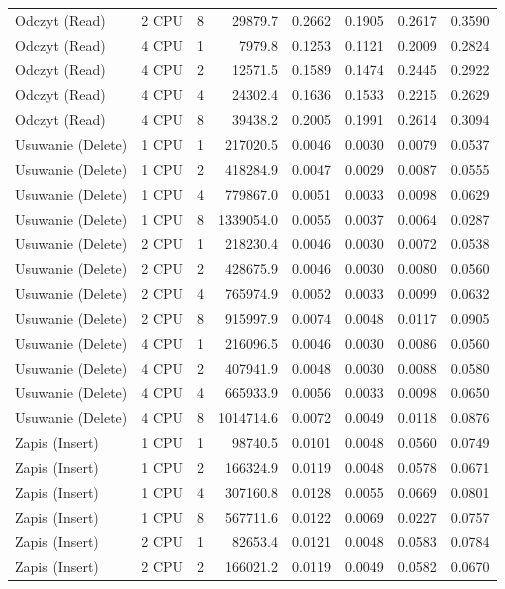\begin{table}[ht]
{\begin{tabular}{llcrrrrr}
Odczyt (Read) & 2 CPU & 8 & 29879.7 & 0.2662 & 0.1905 & 0.2617 & 0.3590 \\
Odczyt (Read) & 4 CPU & 1 & 7979.8 & 0.1253 & 0.1121 & 0.2009 & 0.2824 \\
Odczyt (Read) & 4 CPU & 2 & 12571.5 & 0.1589 & 0.1474 & 0.2445 & 0.2922 \\
Odczyt (Read) & 4 CPU & 4 & 24302.4 & 0.1636 & 0.1533 & 0.2215 & 0.2629 \\
Odczyt (Read) & 4 CPU & 8 & 39438.2 & 0.2005 & 0.1991 & 0.2614 & 0.3094 \\
Usuwanie (Delete) & 1 CPU & 1 & 217020.5 & 0.0046 & 0.0030 & 0.0079 & 0.0537 \\
Usuwanie (Delete) & 1 CPU & 2 & 418284.9 & 0.0047 & 0.0029 & 0.0087 & 0.0555 \\
Usuwanie (Delete) & 1 CPU & 4 & 779867.0 & 0.0051 & 0.0033 & 0.0098 & 0.0629 \\
Usuwanie (Delete) & 1 CPU & 8 & 1339054.0 & 0.0055 & 0.0037 & 0.0064 & 0.0287 \\
Usuwanie (Delete) & 2 CPU & 1 & 218230.4 & 0.0046 & 0.0030 & 0.0072 & 0.0538 \\
Usuwanie (Delete) & 2 CPU & 2 & 428675.9 & 0.0046 & 0.0030 & 0.0080 & 0.0560 \\
Usuwanie (Delete) & 2 CPU & 4 & 765974.9 & 0.0052 & 0.0033 & 0.0099 & 0.0632 \\
Usuwanie (Delete) & 2 CPU & 8 & 915997.9 & 0.0074 & 0.0048 & 0.0117 & 0.0905 \\
Usuwanie (Delete) & 4 CPU & 1 & 216096.5 & 0.0046 & 0.0030 & 0.0086 & 0.0560 \\
Usuwanie (Delete) & 4 CPU & 2 & 407941.9 & 0.0048 & 0.0030 & 0.0088 & 0.0580 \\
Usuwanie (Delete) & 4 CPU & 4 & 665933.9 & 0.0056 & 0.0033 & 0.0098 & 0.0650 \\
Usuwanie (Delete) & 4 CPU & 8 & 1014714.6 & 0.0072 & 0.0049 & 0.0118 & 0.0876 \\
Zapis (Insert) & 1 CPU & 1 & 98740.5 & 0.0101 & 0.0048 & 0.0560 & 0.0749 \\
Zapis (Insert) & 1 CPU & 2 & 166324.9 & 0.0119 & 0.0048 & 0.0578 & 0.0671 \\
Zapis (Insert) & 1 CPU & 4 & 307160.8 & 0.0128 & 0.0055 & 0.0669 & 0.0801 \\
Zapis (Insert) & 1 CPU & 8 & 567711.6 & 0.0122 & 0.0069 & 0.0227 & 0.0757 \\
Zapis (Insert) & 2 CPU & 1 & 82653.4 & 0.0121 & 0.0048 & 0.0583 & 0.0784 \\
Zapis (Insert) & 2 CPU & 2 & 166021.2 & 0.0119 & 0.0049 & 0.0582 & 0.0670 \\

\end{tabular}}
\end{table}
